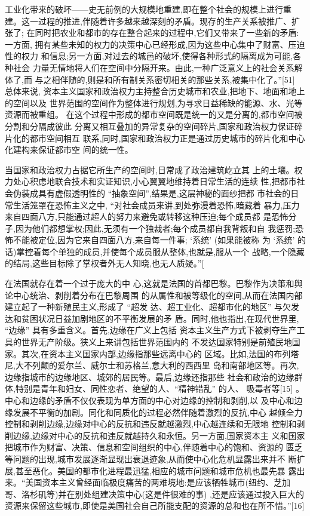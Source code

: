 工业化带来的破坏——史无前例的大规模地重建,即在整个社会的规模上进行重
建。这一过程的推进,伴随着许多越来越深刻的矛盾。现存的生产关系被推广、扩张了;
在同时把农业和都市的存在整合起来的过程中,它们又带来了一些新的矛盾:一方面,
拥有某些未知的权力的决策中心已经形成,因为这些中心集中了财富、压迫性的权力
和信息;另一方面,对过去的城邑的破坏,使得各种形式的隔离成为可能,各种社会
力量无情地将人们在空间中分隔开来。由此,一种广泛意义上的社会关系解体了,而
与之相伴随的,则是和所有制关系密切相关的那些关系,被集中化了。”[51] 总体来说,
资本主义国家和政治权力主持整合历史城市和农业,把地下、地面和地上的空间以及
世界范围的空间作为整体进行规划,为寻求日益稀缺的能源、水、光等资源而被重组。
在这个过程中形成的都市空间既是统一的又是分离的,都市空间被分割和分隔成彼此
分离又相互叠加的异常复杂的空间碎片,国家和政治权力保证碎片化的都市空间相互
联系,同时,国家和政治权力正是通过历史城市的碎片化和中心化建构来保证都市空
间的统一性。

当国家和政治权力占据它所生产的空间时,日常成了政治建筑屹立其
上的土壤。权力处心积虑地联合技术和实证知识,小心翼翼地维持着日常生活的连续
性,把都市社会伪装成具有虚假透明性的 “抽象空间”,结果是,这层神秘的面纱把都
市社会的日常生活笼罩在恐怖主义之中, “对社会成员来讲,到处弥漫着恐怖,暗藏着
暴力,压力来自四面八方,只能通过超人的努力来避免或转移这种压迫;每个成员都
是恐怖分子,因为他们都想掌权;因此,无须有一个独裁者;每个成员都自我背叛和自
我惩罚;恐怖不能被定位,因为它来自四面八方,来自每一件事; ‘系统’ (如果能被称
为 ‘系统’ 的话)掌控着每个单独的成员,并使每个成员服从整体,也就是,服从一个
战略,一个隐藏的结局,这些目标除了掌权者外无人知晓,也无人质疑。”[

在法国就存在着一个过于庞大的中
心,这就是法国的首都巴黎。巴黎作为决策和舆论中心统治、剥削着分布在巴黎周围
的从属性和被等级化的空间,从而在法国内部建立起了一种新殖民主义,形成了 “超发
达、超工业化、超都市化的地区” 与欠发达和贫困状况日益加剧地区的不平衡发展的矛
盾。同时,他也指出,在现代世界里, “边缘” 具有多重含义。首先,边缘在广义上包括
资本主义生产方式下被剥夺生产工具的世界无产阶级。狭义上来讲包括世界范围内的
不发达国家特别是前殖民地国家。其次,在资本主义国家内部,边缘指那些远离中心的
区域。比如,法国的布列塔尼,大不列颠的爱尔兰、威尔士和苏格兰,意大利的西西里
岛和南部地区等。再次,边缘指城市的边缘地区、城郊的居民等。最后,边缘还指那些
社会和政治的边缘群体,特别是青年和妇女、同性恋者、绝望的人、“精神错乱” 的人、
吸毒者等[15] 。中心和边缘的矛盾不仅仅表现为单方面的中心对边缘的控制和剥削,以
及中心和边缘发展不平衡的加剧。同化和同质化的过程必然伴随着激烈的反抗,中心
越倾全力控制和剥削边缘,边缘对中心的反抗和违反就越激烈,中心越连续和无限地
控制和剥削边缘,边缘对中心的反抗和违反就越持久和永恒。另一方面,国家资本主
义和国家把城市作为财富、决策、信息和空间组织的中心,伴随着中心的饱和、资源的
匮乏等问题的出现,城市发展逐渐显现出衰退迹象,从而使中心化危机显露出来并不
断扩展,甚至恶化。美国的都市化进程最迅猛,相应的城市问题和城市危机也最先暴
露出来。“美国资本主义曾经面临极度痛苦的两难境地:是应该牺牲城市(纽约、芝加
哥、洛杉矶等)并在别处组建决策中心(这是件很难的事)
 ,还是应该通过投入巨大的
资源来保留这些城市,即使是美国社会自己所能支配的资源的总和也在所不惜。”[16]

